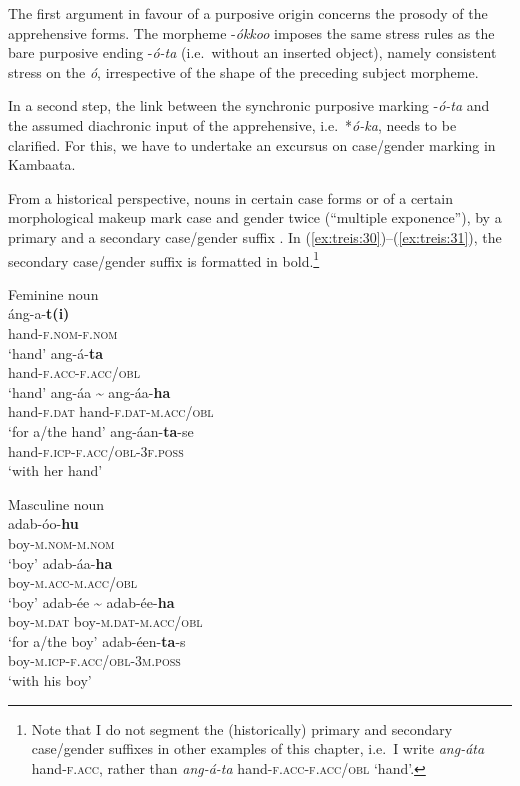 \documentclass[output=paper,colorlinks,citecolor=brown,
]{langsci/langscibook}
\begin{document}
The first argument in favour of a purposive origin concerns the prosody of the apprehensive forms. The morpheme \nobreakdash-\textit{ókkoo} imposes the same stress rules as the bare purposive ending \nobreakdash-\textit{ó-ta} (i.e.\ without an inserted object), namely consistent stress on the \textit{ó}, irrespective of the shape of the preceding subject morpheme.

In a second step, the link between the synchronic purposive marking \nobreakdash-\textit{ó-ta} and the assumed diachronic input of the apprehensive,  i.e.\ *\textit{ó-ka}, needs to be clarified. For this, we have to undertake an excursus on case\slash gender marking in Kambaata.

From a historical perspective, nouns in certain case forms or of a certain morphological makeup mark case and gender twice (``multiple exponence''), by a primary and a secondary case\slash gender suffix \citep[100]{Treis2008}. In (\ref{ex:treis:30})--(\ref{ex:treis:31}), the secondary case\slash gender suffix is formatted in bold.\footnote{Note that I do not segment the (historically) primary and secondary case\slash gender suffixes in other examples of this chapter,  i.e.\ I write \textit{ang-áta} hand-\textsc{f.acc}, rather than \textit{ang-á-ta} hand-\textsc{f.acc-f.acc/obl} `hand'.}

\ea\label{ex:treis:30} \textnormal{Feminine noun}\\
\ea\label{ex:treis:30a}
\gll áng-a-\textbf{t(i)} \\
hand-\textsc{f.nom-f.nom}\\
\glt `hand'
\ex\label{ex:treis:30b}
\gll ang-á-\textbf{ta}\\
hand-\textsc{f.acc-f.acc/obl}\\
\glt `hand'
\ex\label{ex:treis:30c} 
\gll ang-áa		\~{}	ang-áa-\textbf{ha}\\
hand-\textsc{f.dat}	{} hand-\textsc{f.dat-m.acc/obl}\\
\glt `for a/the hand'
\ex\label{ex:treis:30d} 
\gll ang-áan-\textbf{ta}-se\\
hand-\textsc{f.icp-f.acc/obl-3f.poss}\\
\glt `with her hand'
\z 
\z 

\ea\label{ex:treis:31} \textnormal{Masculine noun}\\
\ea\label{ex:treis:31a}
\gll adab-óo-\textbf{hu}\\
boy-\textsc{m.nom-m.nom} \\
\glt `boy'
\ex\label{ex:treis:31b}
\gll adab-áa-\textbf{ha}\\
boy-\textsc{m.acc-m.acc/obl} \\
\glt `boy'
\ex\label{ex:treis:31c}
\gll adab-ée		\~{}	adab-ée-\textbf{ha}\\
boy-\textsc{m.dat}		{} boy-\textsc{m.dat-m.acc/obl}\\
\glt `for a/the boy'
\ex\label{ex:treis:31d}
\gll adab-éen-\textbf{ta}-s\\
boy-\textsc{m.icp-f.acc/obl-3m.poss}\\
\glt `with his boy'
\z 
\z 
\end{document}
